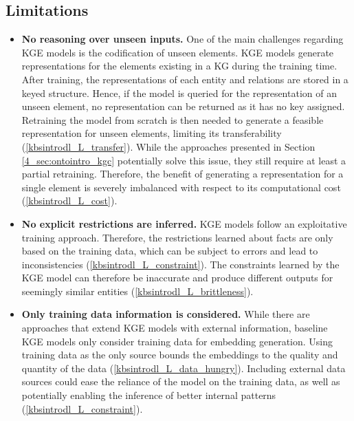 \subsection{Limitations}
\begin{itemize}
    \item \textbf{No reasoning over unseen inputs.} One of the main challenges regarding KGE models is the codification of unseen elements. KGE models generate representations for the elements existing in a KG during the training time. After training, the representations of each entity and relations are stored in a keyed structure. Hence, if the model is queried for the representation of an unseen element, no representation can be returned as it has no key assigned. Retraining the model from scratch is then needed to generate a feasible representation for unseen elements, limiting its transferability (\ref{kbsintrodl_L_transfer}). While the approaches presented in Section \ref{4_sec:ontointro_kgc} potentially solve this issue, they still require at least a partial retraining. Therefore, the benefit of generating a representation for a single element is severely imbalanced with respect to its computational cost (\ref{kbsintrodl_L_cost}). 
    
    \item \textbf{No explicit restrictions are inferred.} KGE models follow an exploitative training approach. Therefore, the restrictions learned about facts are only based on the training data, which can be subject to errors and lead to inconsistencies (\ref{kbsintrodl_L_constraint}). The constraints learned by the KGE model can therefore be inaccurate and produce different outputs for seemingly similar entities (\ref{kbsintrodl_L_brittleness}).  
    
    \item \textbf{Only training data information is considered.} While there are approaches that extend KGE models with external information, baseline KGE models only consider training data for embedding generation. Using training data as the only source bounds the embeddings to the quality and quantity of the data (\ref{kbsintrodl_L_data_hungry}). Including external data sources could ease the reliance of the model on the training data, as well as potentially enabling the inference of better internal patterns (\ref{kbsintrodl_L_constraint}). 
\end{itemize}
